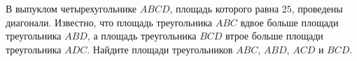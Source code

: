 \begin{ex}
	\begin{condition}
		В выпуклом четырехугольнике \( ABCD \), площадь которого равна \( 25 \), проведены диагонали. Известно, что площадь треугольника \( ABC  \) вдвое больше площади треугольника \( ABD \), а площадь треугольника \( BCD  \) втрое больше площади треугольника \( ADC \). Найдите площади треугольников \( ABC \), \( ABD \), \( ACD \) и \( BCD \).
	\end{condition}
\end{ex}